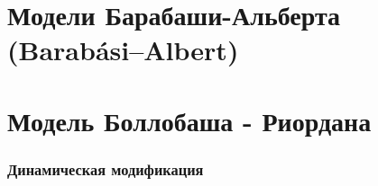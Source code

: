 \documentclass[t]{beamer}
\begin{document}
    \section{Модели Барабаши-Альберта (Barabási–Albert)} 
        \subsection{}

        \begin{frame}
            
        \end{frame}	

        \begin{frame}
            
        \end{frame}	

        \begin{frame}
            
        \end{frame}	
        
        \begin{frame}
            
        \end{frame}	

        \begin{frame}
            
        \end{frame}	

    \section{Модель Боллобаша - Риордана}
        \subsubsection{}
        \begin{frame}
            
        \end{frame}	
    
        \subsubsection{Динамическая модификация}
        \begin{frame}
            
        \end{frame}	
                
\end{document}
